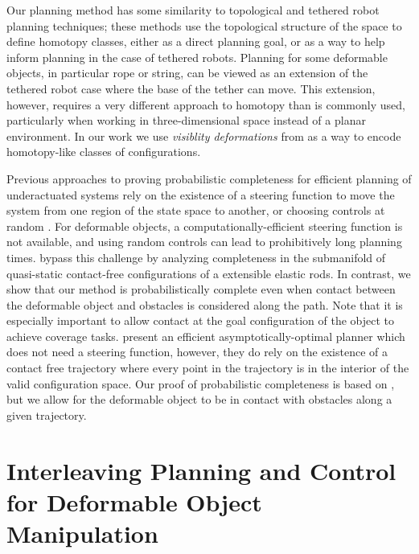 Our planning method has some similarity to topological \cite{Jaillet2008, Bhattacharya2012} and tethered robot \cite{Brass2015, SoonkyumKim2015} planning techniques; these methods use the topological structure of the space to define homotopy classes, either as a direct planning goal, or as a way to help inform planning in the case of tethered robots. Planning for some deformable objects, in particular rope or string, can be viewed as an extension of the tethered robot case where the base of the tether can move. This extension, however, requires a very different approach to homotopy than is commonly used, particularly when working in three-dimensional space instead of a planar environment. In our work we use \textit{visiblity deformations} from \cite{Jaillet2008} as a way to encode homotopy-like classes of configurations.

Previous approaches to proving probabilistic completeness for efficient planning of underactuated systems rely on the existence of a steering function to move the system from one region of the state space to another, or choosing controls at random \cite{LaValle2001, Karaman2013, Kunz2015, LiAOKP2016}. For deformable objects, a computationally-efficient steering function is not available, and using random controls can lead to prohibitively long planning times. \citet{Roussel2015} bypass this challenge by analyzing completeness in the submanifold of quasi-static contact-free configurations of a extensible elastic rods. In contrast, we show that our method is probabilistically complete even when contact between the deformable object and obstacles is considered along the path. Note that it is especially important to allow contact at the goal configuration of the object to achieve coverage tasks. \citet{LiAOKP2016} present an efficient asymptotically-optimal planner which does not need a steering function, however, they do rely on the existence of a contact free trajectory where every point in the trajectory is in the interior of the valid configuration space. Our proof of probabilistic completeness is based on \citet{LiAOKP2016}, but we allow for the deformable object to be in contact with obstacles along a given trajectory.


\section{Interleaving Planning and Control for Deformable Object Manipulation}

